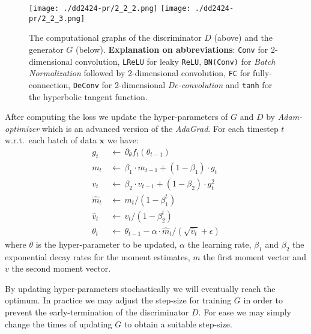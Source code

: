 \documentclass[runningheads]{llncs}
\begin{document}
\begin{figure}
\begin{center}
\texttt{[image: ./dd2424-pr/2\_2\_2.png]}
\texttt{[image: ./dd2424-pr/2\_2\_3.png]}
\caption{The computational graphs of the discriminator $D$ (above) and the generator $G$ (below). \textbf{Explanation on abbreviations}: \texttt{Conv} for 2-dimensional convolution, \texttt{LReLU} for leaky \texttt{ReLU}, \texttt{BN(Conv)} for \textit{Batch Normalization} followed by 2-dimensional convolution, \texttt{FC} for fully-connection, \texttt{DeConv} for 2-dimensional \textit{De-convolution} and \texttt{tanh} for the hyperbolic tangent function.}
\end{center}
\end{figure}

After computing the loss we update the hyper-parameters of $G$ and $D$ by \textit{Adam-optimizer} \cite{kingma_ba_2017} which is an advanced version of the \textit{AdaGrad}. For each timestep $t$ w.r.t.\ each batch of data $\textbf{x}$ we have:
\begin{align}
g_t\,&\leftarrow\,\partial_{\theta}f_t(\theta_{t-1})\\
m_t\,&\leftarrow\,\beta_1\cdot m_{t-1}+(1-\beta_1)\cdot g_t\\
v_t\,&\leftarrow\,\beta_2\cdot v_{t-1}+(1-\beta_2)\cdot g_{t}^{2}\\
\hat{m}_t\,&\leftarrow\,m_t/(1-\beta_{1}^{t})\\
\hat{v}_t\,&\leftarrow\,v_t/(1-\beta_{2}^{t})\\
\theta_t\,&\leftarrow\,\theta_{t-1}-\alpha\cdot\hat{m}_t/(\sqrt{\hat{v}_t}+\epsilon)
\end{align}
where $\theta$ is the hyper-parameter to be updated, $\alpha$ the learning rate, $\beta_1$ and $\beta_2$ the exponential decay rates for the moment estimates, $m$ the first moment vector and $v$ the second moment vector.

By updating hyper-parameters stochastically we will eventually reach the optimum. In practice we may adjust the step-size for training $G$ in order to prevent the early-termination of the discriminator $D$. For ease we may simply change the times of updating $G$ to obtain a suitable step-size.
\end{document}
